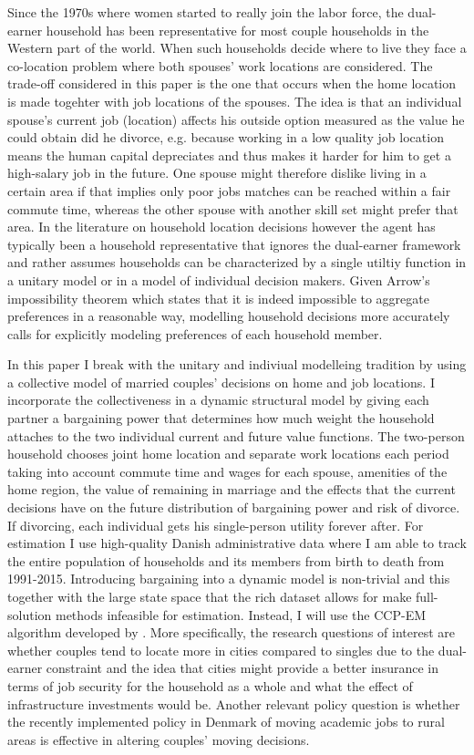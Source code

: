 Since the 1970s where women started to really join the labor force, the dual-earner household has been representative for most couple households in the Western part of the world. When such households decide where to live they face a co-location problem where both spouses' work locations are considered. The trade-off considered in this paper is the one that occurs when the home location is made togehter with job locations of the spouses. The idea is that an individual spouse's current job (location) affects his outside option measured as the value he could obtain did he divorce, e.g. because working in a low quality job location means the human capital depreciates and thus makes it harder for him to get a high-salary job in the future. One spouse might therefore dislike living in a certain area if that implies only poor jobs matches can be reached within a fair commute time, whereas the other spouse with another skill set might prefer that area. In the literature on household location decisions however the agent has typically been a household representative that ignores the dual-earner framework and rather assumes households can be characterized by a single utiltiy function in a unitary model or in a model of individual decision makers. Given Arrow's impossibility theorem which states that it is indeed impossible to aggregate preferences in a reasonable way, modelling household decisions more accurately calls for explicitly modeling preferences of each household member. 

In this paper I break with the unitary and indiviual modelleing tradition by using a collective model of married couples' decisions on home and job locations. I incorporate the collectiveness in a dynamic structural model by giving each partner a bargaining power that determines how much weight the household attaches to the two individual current and future value functions. The two-person household chooses joint home location and separate work locations each period taking into account commute time and wages for each spouse, amenities of the home region, the value of remaining in marriage and the effects that the current decisions have on the future distribution of bargaining power and risk of divorce. If divorcing, each individual gets his single-person utility forever after. For estimation I use high-quality Danish administrative data where I am able to track the entire population of households and its members from birth to death from 1991-2015. Introducing bargaining into a dynamic model is non-trivial and this together with the large state space that the rich dataset allows for make full-solution methods infeasible for estimation. Instead, I will use the CCP-EM algorithm developed by \cite{ArcidiaconoMiller2011}. More specifically, the research questions of interest are whether couples tend to locate more in cities compared to singles due to the dual-earner constraint and the idea that cities might provide a better insurance in terms of job security for the household as a whole and what the effect of infrastructure investments would be. Another relevant policy question is whether the recently implemented policy in Denmark of moving academic jobs to rural areas is effective in altering couples' moving decisions.

